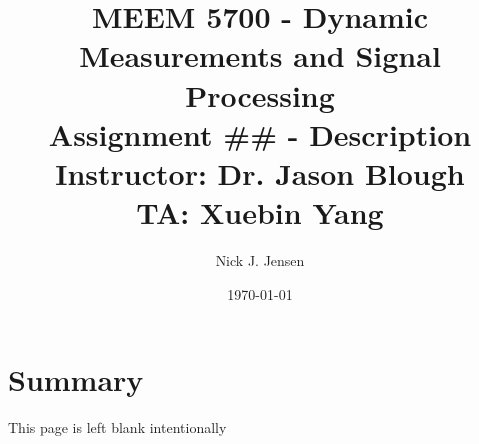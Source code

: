 \documentclass[12pt]{article}
\title{MEEM 5700 - Dynamic Measurements and Signal Processing \\
\bigskip
\large Assignment ## - Description \\
\bigskip
\bigskip
\small Instructor: Dr. Jason Blough \\
\small TA: Xuebin Yang}
\author{Nick J. Jensen}
\date{\today}
\begin{document}
\maketitle


\clearpage







\section*{Summary}










\clearpage
\appendix
\appendixpage


\vfil
\hfil This page is left blank intentionally \hfil
\vfil

%




\end{document}
